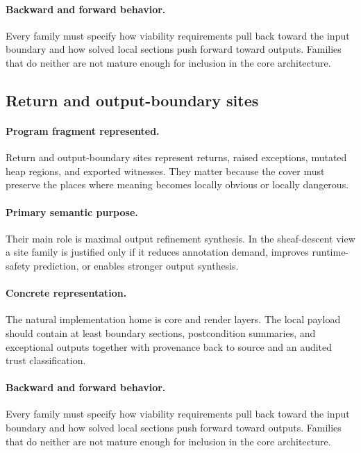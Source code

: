 \documentclass[11pt]{report}
\theoremstyle{definition}
\theoremstyle{plain}
\begin{document}
\paragraph{Backward and forward behavior.}
Every family must specify how viability requirements pull back toward the
input boundary and how solved local sections push forward toward outputs.
Families that do neither are not mature enough for inclusion in the core
architecture.

\subsection{Return and output-boundary sites}

\paragraph{Program fragment represented.}
Return and output-boundary sites represent returns, raised exceptions, mutated heap regions, and exported witnesses. They matter because the cover must preserve the
places where meaning becomes locally obvious or locally dangerous.

\paragraph{Primary semantic purpose.}
Their main role is maximal output refinement synthesis. In the sheaf-descent view a site family is
justified only if it reduces annotation demand, improves runtime-safety
prediction, or enables stronger output synthesis.

\paragraph{Concrete representation.}
The natural implementation home is core and render layers. The local payload should contain
at least boundary sections, postcondition summaries, and exceptional outputs together with provenance back to source and an audited
trust classification.

\paragraph{Backward and forward behavior.}
Every family must specify how viability requirements pull back toward the
input boundary and how solved local sections push forward toward outputs.
Families that do neither are not mature enough for inclusion in the core
architecture.
\end{document}
